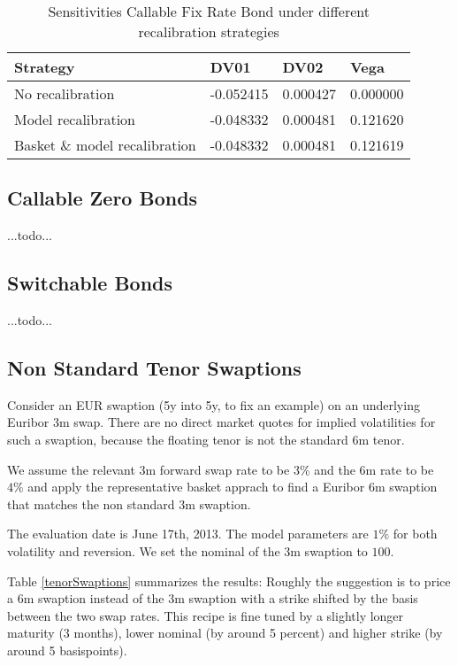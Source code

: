 \documentclass{amsart}
\theoremstyle{plain}
\numberwithin{equation}{section}
\begin{document}
\begin{table}[ht]
\caption{Sensitivities Callable Fix Rate Bond under different recalibration strategies}
\begin{tabular}{l | l | l | l}
Strategy & DV01 & DV02 & Vega \\ \hline
No recalibration & -0.052415 & 0.000427 & 0.000000 \\
Model recalibration & -0.048332 & 0.000481 & 0.121620 \\
Basket \& model recalibration & -0.048332 & 0.000481 & 0.121619
\end{tabular}
\label{sensisFixBond}
\end{table}


\subsection{Callable Zero Bonds}

...todo...

\subsection{Switchable Bonds}

...todo...

\subsection{Non Standard Tenor Swaptions}

Consider an EUR swaption (5y into 5y, to fix an example) on an underlying Euribor 3m swap. There are no direct
market quotes for implied volatilities for such a swaption, because the floating tenor is not the standard 6m
tenor.

We assume the relevant 3m forward swap rate to be $3\%$ and the 6m rate to be $4\%$ 
and apply the representative basket apprach to find a Euribor 6m swaption that matches the non standard 3m swaption.

The evaluation date is June 17th, 2013. The model parameters are $1\%$ for both volatility and reversion. We
set the nominal of the 3m swaption to $100$.

Table \ref{tenorSwaptions} summarizes the results: Roughly the suggestion is to price a 6m swaption instead of
the 3m swaption with a strike shifted by the basis between the two swap rates. This recipe is fine tuned by
a slightly longer maturity (3 months), lower nominal (by around 5 percent) and higher strike (by around 5 basispoints).
\end{document}
